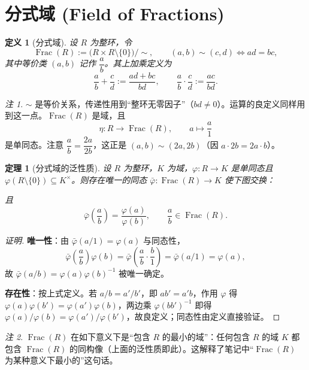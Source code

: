 \documentclass[11pt,a4paper]{ctexart}
\newtheorem*{theorem}{定理}
\newtheorem*{definition}{定义}
\theoremstyle{remark}
\newtheorem*{remark}{注}
\DeclareMathOperator{\Frac}{Frac}
\begin{document}
\section*{分式域 (Field of Fractions)}

\begin{definition}[分式域]
设 $R$ 为整环，令
\[
\Frac(R):=\bigl(R\times R\setminus\{0\}\bigr)\big/\sim,\qquad
(a,b)\sim(c,d)\iff ad=bc ,
\]
其中等价类 $(a,b)$ 记作 $\dfrac{a}{b}$。其上加乘定义为
\[
\frac{a}{b}+\frac{c}{d}:=\frac{ad+bc}{bd},\qquad
\frac{a}{b}\cdot\frac{c}{d}:=\frac{ac}{bd}.
\]
\end{definition}

\begin{remark}
$\sim$ 是等价关系，传递性用到“整环无零因子”（$bd\neq 0$）。运算的良定义同样用到这一点。$\Frac(R)$ 是域，且
\[
\eta:R\to\Frac(R),\qquad a\mapsto \frac{a}{1}
\]
是单同态。注意 $\dfrac{a}{b}=\dfrac{2a}{2b}$，这正是 $(a,b)\sim(2a,2b)$（因 $a\cdot 2b=2a\cdot b$）。
\end{remark}

\begin{theorem}[分式域的泛性质]
设 $R$ 为整环，$K$ 为域，$\varphi:R\to K$ 是单同态且 $\varphi(R\setminus\{0\})\subseteq K^{\times}$。则存在唯一的同态 $\bar\varphi:\Frac(R)\to K$ 使下图交换：
\begin{center}
\end{center}
且
\[
\bar\varphi\!\left(\frac{a}{b}\right)=\frac{\varphi(a)}{\varphi(b)},\qquad \frac{a}{b}\in\Frac(R).
\]
\end{theorem}

\begin{proof}[证明]
\textbf{唯一性}：由 $\bar\varphi(a/1)=\varphi(a)$ 与同态性，
\[
\bar\varphi\!\left(\frac{a}{b}\right)\varphi(b)=\bar\varphi\!\left(\frac{a}{b}\cdot\frac{b}{1}\right)=\bar\varphi(a/1)=\varphi(a),
\]
故 $\bar\varphi(a/b)=\varphi(a)\varphi(b)^{-1}$ 被唯一确定。

\textbf{存在性}：按上式定义。若 $a/b=a'/b'$，即 $ab'=a'b$，作用 $\varphi$ 得 $\varphi(a)\varphi(b')=\varphi(a')\varphi(b)$，两边乘 $\varphi(bb')^{-1}$ 即得 $\varphi(a)/\varphi(b)=\varphi(a')/\varphi(b')$，故良定义；同态性由定义直接验证。
\end{proof}

\begin{remark}
$\Frac(R)$ 在如下意义下是“包含 $R$ 的最小的域”：任何包含 $R$ 的域 $K$ 都包含 $\Frac(R)$ 的同构像（上面的泛性质即此）。这解释了笔记中“$\Frac(R)$ 为某种意义下最小的”这句话。
\end{remark}
\end{document}
